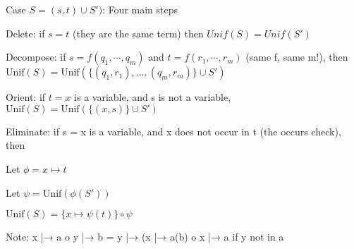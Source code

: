 Case $S = {(s, t)} \cup S')$: Four main steps

Delete: if $s = t$ (they are the same term)
then $Unif(S) = Unif(S')$

Decompose: if $s = f(q_1, \cdots, q_m )$ and
$t = f(r_1, \cdots, r_m )$ (same f, same m!), then
$\text{Unif}(S) = \text{Unif}(\{(q_1 , r_1 ), ..., (q_m , r_m )\} \cup S')$

Orient: if $t = x$ is a variable, and s is not a
variable, $\text{Unif}(S) = \text{Unif} (\{(x,s)\} \cup S')$

Eliminate: if s = x is a variable, and
x does not occur in t (the occurs
check), then

Let $\phi = x \mapsto t$

Let $\psi = \text{Unif}(\phi(S'))$

$\text{Unif}(S) = \{x \mapsto \psi(t) \} \circ \psi$

Note: {x |→ a} o {y |→ b} =
{y |→ ({x |→ a}(b)} o {x |→ a} if y not
in a

